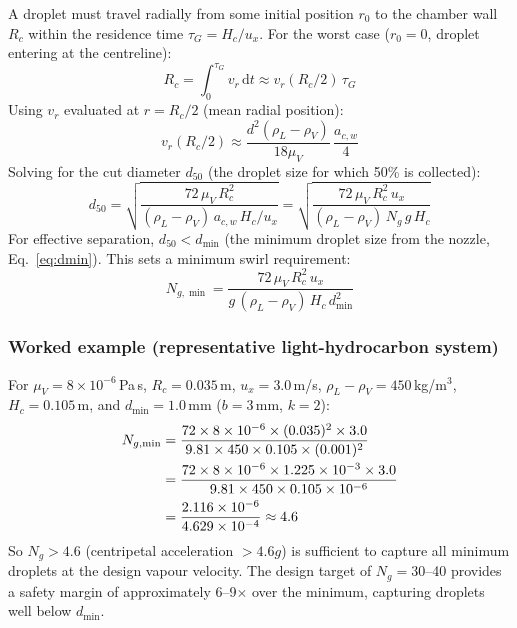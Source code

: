 \documentclass[11pt,letterpaper]{article}
\newcommand{\rhoL}{\rho_L}
\newcommand{\rhoV}{\rho_V}
\newcommand{\ux}{u_{x}}
\newcommand{\Rc}{R_c}
\newcommand{\Hc}{H_c}
\newcommand{\dmin}{d_{\min}}
\newcommand{\dcut}{d_{50}}
\begin{document}
A droplet must travel radially from some initial position $r_0$ to the
chamber wall $\Rc$ within the residence time $\tau_G = \Hc/\ux$.  For
the worst case ($r_0 = 0$, droplet entering at the centreline):
\begin{equation}
  \Rc = \int_0^{\tau_G} v_r\,\mathrm{d}t
      \approx v_r(\Rc/2)\,\tau_G
  \label{eq:rc_integral}
\end{equation}
Using $v_r$ evaluated at $r = \Rc/2$ (mean radial position):
\begin{equation}
  v_r(\Rc/2) \approx \frac{d^2(\rhoL-\rhoV)}{18\mu_V}\,\frac{a_{c,w}}{4}
  \label{eq:vr_mean}
\end{equation}
Solving for the cut diameter $\dcut$ (the droplet size for which 50\% is
collected):
\begin{equation}
  \dcut = \sqrt{\frac{72\,\mu_V\,\Rc^2}
                     {(\rhoL-\rhoV)\,a_{c,w}\,\Hc/\ux}}
        = \sqrt{\frac{72\,\mu_V\,\Rc^2\,\ux}
                     {(\rhoL-\rhoV)\,N_g\,g\,\Hc}}
  \label{eq:d50}
\end{equation}
For effective separation, $\dcut < \dmin$ (the minimum droplet size from the
nozzle, Eq.~\ref{eq:dmin}).  This sets a minimum swirl requirement:
\begin{equation}
  N_{g,\min} = \frac{72\,\mu_V\,\Rc^2\,\ux}
                    {g\,(\rhoL-\rhoV)\,\Hc\,\dmin^2}
  \label{eq:ng_min}
\end{equation}

\subsubsection{Worked example (representative light-hydrocarbon system)}

For $\mu_V = 8\times10^{-6}$\,Pa\,s, $\Rc = 0.035$\,m,
$\ux = 3.0$\,m/s, $\rhoL - \rhoV = 450$\,kg/m$^3$, $\Hc = 0.105$\,m,
and $\dmin = 1.0$\,mm ($b = 3$\,mm, $k = 2$):
\begin{align}
  N_{g,\min} &= \frac{72\times 8\times10^{-6}\times(0.035)^2\times 3.0}
                    {9.81\times 450\times 0.105\times(0.001)^2} \notag\\
             &= \frac{72\times 8\times10^{-6}\times 1.225\times10^{-3}\times 3.0}
                    {9.81\times 450\times 0.105\times10^{-6}} \notag\\
             &= \frac{2.116\times10^{-6}}{4.629\times10^{-4}} \approx 4.6
  \label{eq:ng_example}
\end{align}
So $N_g > 4.6$ (centripetal acceleration $> 4.6g$) is sufficient to capture
all minimum droplets at the design vapour velocity.  The design target of
$N_g = 30$--40 provides a safety margin of approximately 6--9$\times$ over
the minimum, capturing droplets well below $\dmin$.
\end{document}
